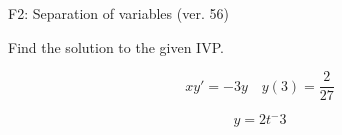\begin{exercise}
  \begin{exerciseTitle}F2: Separation of variables (ver. 56)\end{exerciseTitle}
  \begin{exerciseStatement}
    
Find the solution to the given IVP.

    
\[xy'= -3 y \hspace{1em} y( 3 ) = \frac{2}{27}\]

  \end{exerciseStatement}
  \begin{exerciseAnswer}
    
\[y= 2 t^ -3\]

  \end{exerciseAnswer}
\end{exercise}